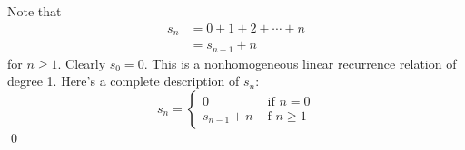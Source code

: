 
Note that
\begin{align*}
s_n &= 0 + 1 + 2 + \cdots + n \\
    &= s_{n - 1} + n
\end{align*}
for $n \geq 1$.
Clearly $s_0 = 0$.
This is a nonhomogeneous linear recurrence relation of degree 1.
Here's a complete description of $s_n$:
\[
s_n =
\begin{cases}
  0 & \text{ if } n = 0 \\
  s_{n - 1} + n & \text{ f } n \geq 1
\end{cases}
\]
\qed

